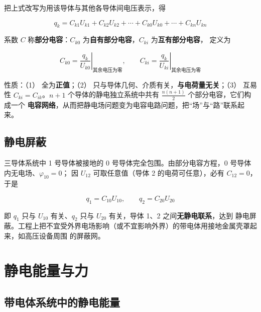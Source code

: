把上式改写为用该导体与其他各导体间电压表示，得
\begin{formulaBox}
\[
q_k=C_{k1}U_{k1}+C_{k2}U_{k2}+\cdots+C_{k0}U_{k0}+\cdots+C_{kn}U_{kn}
\]
\end{formulaBox}

系数 $C$ 称\textbf{部分电容}：$C_{k0}$ 为\textbf{自有部分电容}，$C_{ki}$ 为\textbf{互有部分电容}，
定义为
\begin{formulaBox}
\[
C_{k0}=\left.\frac{q_k}{U_{k0}}\right|_{\text{其余电压为零}},
\qquad
C_{ki}=\left.\frac{q_k}{U_{ki}}\right|_{\text{其余电压为零}}
\]
\end{formulaBox}

性质：（1） 全为\textbf{正值}；（2） 只与导体几何、介质有关，\textbf{与电荷量无关}；（3） 互易性
$C_{ki}=C_{ik}$。$n+1$ 个导体的静电独立系统中共有 $\frac{n(n+1)}{2}$ 个部分电容，它们构成一个
\textbf{电容网络}，从而把静电场问题变为电容电路问题，把“场”与“路”联系起来。


\subsection{静电屏蔽}

三导体系统中 1 号导体被接地的 0 号导体完全包围。由部分电容方程，0 号导体内无电场、$\varphi_{10}=0$；
因 $U_{12}$ 可取任意值（导体 2 的电荷可任意），必有 $C_{12}=0$，于是
\begin{formulaBox}
\[
q_1=C_{10}U_{10},
\qquad
q_2=C_{20}U_{20}
\]
\end{formulaBox}

即 $q_1$ 只与 $U_{10}$ 有关、$q_2$ 只与 $U_{20}$ 有关，导体 1、2 之间\textbf{无静电联系}，达到
静电屏蔽。工程上把不宜受外界电场影响（或不宜影响外界）的带电体用接地金属壳罩起来，如高压设备周围
的屏蔽网。

\section{静电能量与力}

\subsection{带电体系统中的静电能量}

